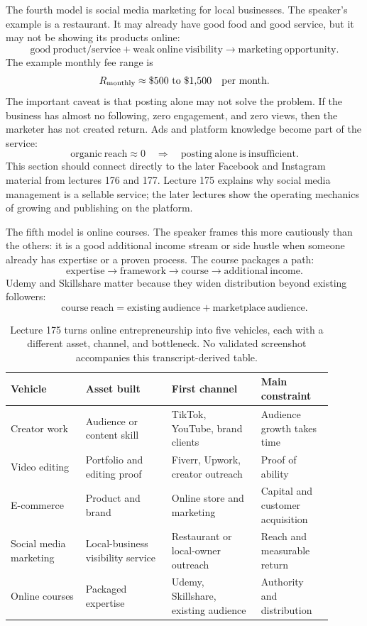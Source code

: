 \documentclass[11pt,oneside]{book}
\begin{document}
The fourth model is social media marketing for local businesses. The speaker's example is a restaurant. It may already have good food and good service, but it may not be showing its products online:
\[
\mathrm{good\ product/service}
+
\mathrm{weak\ online\ visibility}
\longrightarrow
\mathrm{marketing\ opportunity}.
\]
The example monthly fee range is
\[
R_{\mathrm{monthly}}
\approx
\$500 \hbox{ to } \$1{,}500
\quad \hbox{per month}.
\]
The important caveat is that posting alone may not solve the problem. If the business has almost no following, zero engagement, and zero views, then the marketer has not created return. Ads and platform knowledge become part of the service:
\[
\mathrm{organic\ reach}\approx 0
\quad \Longrightarrow \quad
\mathrm{posting\ alone\ is\ insufficient}.
\]
This section should connect directly to the later Facebook and Instagram material from lectures 176 and 177. Lecture 175 explains why social media management is a sellable service; the later lectures show the operating mechanics of growing and publishing on the platform.

The fifth model is online courses. The speaker frames this more cautiously than the others: it is a good additional income stream or side hustle when someone already has expertise or a proven process. The course packages a path:
\[
\mathrm{expertise}
\longrightarrow
\mathrm{framework}
\longrightarrow
\mathrm{course}
\longrightarrow
\mathrm{additional\ income}.
\]
Udemy and Skillshare matter because they widen distribution beyond existing followers:
\[
\mathrm{course\ reach}
=
\mathrm{existing\ audience}
+
\mathrm{marketplace\ audience}.
\]

\begin{table}
\centering
\small
\begin{tabular}{p{0.21\linewidth}p{0.24\linewidth}p{0.25\linewidth}p{0.20\linewidth}}
\hline
Vehicle & Asset built & First channel & Main constraint \\
\hline
Creator work & Audience or content skill & TikTok, YouTube, brand clients & Audience growth takes time \\
Video editing & Portfolio and editing proof & Fiverr, Upwork, creator outreach & Proof of ability \\
E-commerce & Product and brand & Online store and marketing & Capital and customer acquisition \\
Social media marketing & Local-business visibility service & Restaurant or local-owner outreach & Reach and measurable return \\
Online courses & Packaged expertise & Udemy, Skillshare, existing audience & Authority and distribution \\
\hline
\end{tabular}
\caption{Lecture 175 turns online entrepreneurship into five vehicles, each with a different asset, channel, and bottleneck. No validated screenshot accompanies this transcript-derived table.}
\end{table}
\end{document}
